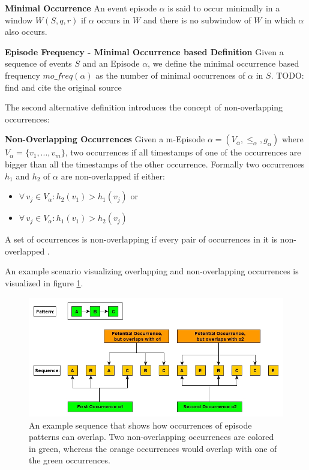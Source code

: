 \begin{mydef}
\textbf{Minimal Occurrence} An event episode $\alpha$ is said to occur minimally in a window $W(S,q,r)$ if $\alpha$ occurs in $W$ and there is no subwindow of $W$ in which $\alpha$ also occurs. %
\end{mydef}

\begin{mydef}
\textbf{Episode Frequency - Minimal Occurrence based Definition} Given a sequence of events $S$ and an Episode $\alpha$, we define the minimal occurrence based frequency $mo\_freq(\alpha )$ as the number of minimal occurrences of $\alpha$ in $S$. TODO: find and cite the original source
\end{mydef}

The second alternative definition introduces the concept of non-overlapping occurrences:

\begin{mydef}
\textbf{Non-Overlapping Occurrences} Given a m-Episode $\alpha = (V_\alpha,{\leq}_{\alpha},g_\alpha)$ where $V_\alpha = \{v_1,...,v_m\}$, two occurrences if all timestamps of one of the occurrences are bigger than all the timestamps of the other occurrence. Formally two occurrences $h_1$ and $h_2$ of $\alpha$ are non-overlapped if either:
\begin{itemize}
	\item $\forall \, v_j \in V_\alpha : h_2(v_1)>h_1(v_j)$ or 
	\item $\forall \, v_j \in V_\alpha : h_1(v_1)>h_2(v_j)$
\end{itemize}
A set of occurrences is non-overlapping if every pair of occurrences in it is non-overlapped \cite{laxman2007fast}.
\end{mydef}

An example scenario visualizing overlapping and non-overlapping occurrences is visualized in figure \ref{fig_nonOverlappingExample}.


\begin{figure}[h]
	\centering
  	\includegraphics[width=\textwidth]{nonOverlappingExample}
	\caption{An example sequence that shows how occurrences of episode patterns can overlap. Two non-overlapping occurrences are colored in green, whereas the orange occurrences would overlap with one of the green occurrences.}
	\label{fig_nonOverlappingExample}
\end{figure}

